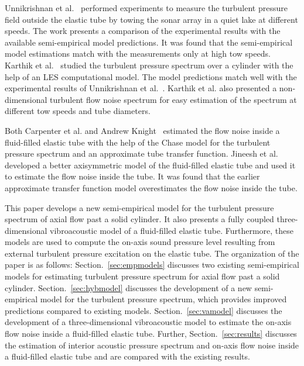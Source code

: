 \documentclass[twocolumn,10pt]{asme2ej}
\begin{document}
Unnikrishnan et al.~\cite{Unni2011} performed experiments to measure the turbulent pressure field outside the elastic tube by towing the sonar array in a quiet lake at different speeds. The work presents a comparison of the experimental results with the available semi-empirical model predictions. It was found that the semi-empirical model estimations match with the measurements only at high tow speeds. Karthik et al.~\cite{karthik2021} studied the turbulent pressure spectrum over a cylinder with the help of an LES computational model. The model predictions match well with the experimental results of Unnikrishnan et al.~\cite{Unni2011}. Karthik et al. also presented a non-dimensional turbulent flow noise spectrum for easy estimation of the spectrum at different tow speeds and tube diameters.

Both Carpenter et al.\cite{carpenter1983} and Andrew Knight~\cite{knight1996} estimated the flow noise inside a fluid-filled elastic tube with the help of the Chase model for the turbulent pressure spectrum and an approximate tube transfer function. Jineesh et al.~\cite{jineesh2013} developed a better axisymmetric model of the fluid-filled elastic tube and used it to estimate the flow noise inside the tube. It was found that the earlier approximate transfer function model overestimates the flow noise inside the tube.

This paper develops a new semi-empirical model for the turbulent pressure spectrum of axial flow past a solid cylinder. It also presents a fully coupled three-dimensional vibroacoustic model of a fluid-filled elastic tube. Furthermore, these models are used to compute the on-axis sound pressure level resulting from external turbulent pressure excitation on the elastic tube. The organization of the paper is as follows: Section.~\ref{sec:empmodels} discusses two existing semi-empirical models for estimating turbulent pressure spectrum for axial flow past a solid cylinder. Section.~\ref{sec:hybmodel} discusses the development of a new semi-empirical model for the turbulent pressure spectrum, which provides improved predictions compared to existing models. Section.~\ref{sec:vamodel} discusses the development of a three-dimensional vibroacoustic model to estimate the on-axis flow noise inside a fluid-filled elastic tube. Further, Section.~\ref{sec:results} discusses the estimation of interior acoustic pressure spectrum and on-axis flow noise inside a fluid-filled elastic tube and are compared with the existing results.
\end{document}
